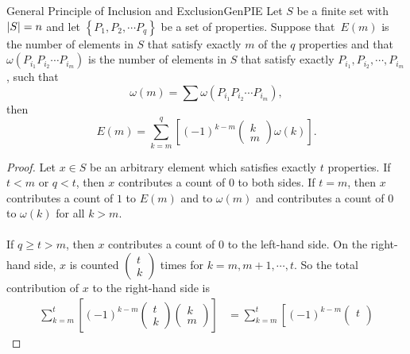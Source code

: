 \documentclass[math]{amznotes}
\theoremstyle{remark}
\begin{document}
\begin{thmbox}{General Principle of Inclusion and Exclusion}{GenPIE}
    Let $S$ be a finite set with ${\left\lvert {S} \right\rvert} = n$ and let $\left\{P_1, P_2, \cdots P_q\right\}$ be a set of properties. Suppose that~$E(m)$ is the number of elements in $S$ that satisfy exactly $m$ of the $q$ properties and that~$\omega(P_{i_1}P_{i_2}\cdots P_{i_m})$ is the number of elements in $S$ that satisfy exactly $P_{i_1}, P_{i_2},\cdots, P_{i_m}$, such that
    \begin{equation*}
        \omega(m) = \sum \omega(P_{i_1}P_{i_2}\cdots P_{i_m}),
    \end{equation*}
    then
    \begin{equation*}
        E(m) = \sum_{k = m}^{q}\left[(-1)^{k - m}\begin{pmatrix}
            k \\
            m
        \end{pmatrix}\omega(k)\right].
    \end{equation*}
    \tcblower
    \begin{proof}
        Let $x \in S$ be an arbitrary element which satisfies exactly $t$ properties. If $t < m$ or $q < t$, then $x$ contributes a count of $0$ to both sides. If $t = m$, then $x$ contributes a count of $1$ to $E(m)$ and to $\omega(m)$ and contributes a count of $0$ to $\omega(k)$ for all $k > m$.
        \\\\
        If $q \geq t > m$, then $x$ contributes a count of $0$ to the left-hand side. On the right-hand side, $x$ is counted $\left(\begin{smallmatrix}
            t \\
            k
        \end{smallmatrix}\right)$ times for $k = m, m + 1, \cdots, t$. So the total contribution of $x$ to the right-hand side is
        \begin{align*}
            \sum_{k = m}^{t}\left[(-1)^{k - m}\begin{pmatrix}
                t \\
                k
            \end{pmatrix}\begin{pmatrix}
                k \\
                m
            \end{pmatrix}\right] & = \sum_{k = m}^{t}\left[(-1)^{k - m}\begin{pmatrix}
                t \\

\end{pmatrix}
\end{align*}
\end{proof}
\end{thmbox}
\end{document}
